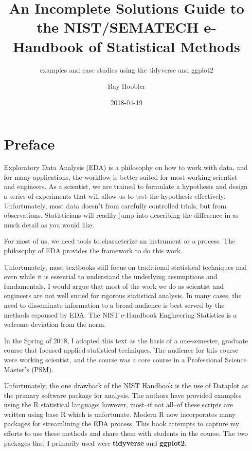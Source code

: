 \documentclass[]{book}
\title{An Incomplete Solutions Guide to the NIST/SEMATECH e-Handbook of
Statistical Methods}
\subtitle{examples and case studies using the tidyverse and ggplot2}
\author{Ray Hoobler}
\date{2018-04-19}
\theoremstyle{definition}
\theoremstyle{definition}
\theoremstyle{definition}
\theoremstyle{remark}
\begin{document}
\maketitle

{
\setcounter{tocdepth}{1}
\tableofcontents
}
\hypertarget{preface}{%
\chapter*{Preface}\label{preface}}

Exploratory Data Analysis (EDA) is a philosophy on how to work with
data, and for many applications, the workflow is better suited for most
working scientist and engineers. As a scientist, we are trained to
formulate a hypothesis and design a series of experiments that will
allow us to test the hypothesis effectively. Unfortunately, most data
doesn't from carefully controlled trials, but from observations.
Statisticians will readily jump into describing the difference in as
much detail as you would like.

For most of us, we need tools to characterize an instrument or a
process. The philosophy of EDA provides the framework to do this work.

Unfortunately, most textbooks still focus on traditional statistical
techniques and even while it is essential to understand the underlying
assumptions and fundamentals, I would argue that most of the work we do
as scientist and engineers are not well suited for rigorous statistical
analysis. In many cases, the need to disseminate information to a broad
audience is best served by the methods espoused by EDA. The NIST
e-Handbook Engineering Statistics is a welcome deviation from the norm.

In the Spring of 2018, I adopted this text as the basis of a
one-semester, graduate course that focused applied statistical
techniques. The audience for this course were working scientist, and the
course was a core course in a Professional Science Master's (PSM).

Unfortunately, the one drawback of the NIST Handbook is the use of
Dataplot as the primary software package for analysis. The authors have
provided examples using the R statistical language; however, most--if
not all--of these scripts are written using base R which is unfortunate.
Modern R now incorporates many packages for streamlining the EDA
process. This book attempts to capture my efforts to use these methods
and share them with students in the course. The two packages that I
primarily used were \textbf{tidyverse} and \textbf{ggplot2}.
\end{document}
